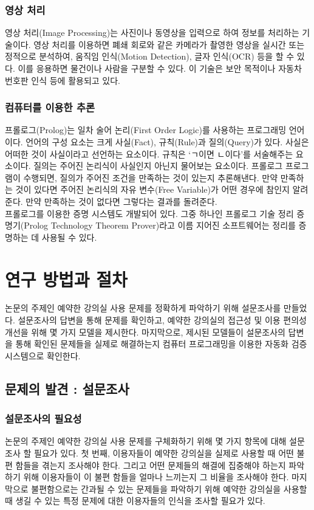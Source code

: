 \documentclass[11pt,a4paper]{article}
\begin{document}
\subsubsection{영상 처리}
영상 처리(Image Processing)는 사진이나 동영상을 입력으로 하여 정보를 처리하는 기술이다. 영상 처리를 이용하면 폐쇄 회로와 같은 카메라가 촬영한 영상을 실시간 또는 정적으로 분석하여, 움직임 인식(Motion Detection), 글자 인식(OCR) 등을 할 수 있다. 이를 응용하면 물건이나 사람을 구분할 수 있다. 이 기술은 보안 목적이나 자동차 번호판 인식 등에 활용되고 있다.

\subsubsection{컴퓨터를 이용한 추론}
프롤로그(Prolog)는 일차 술어 논리(First Order Logic)를 사용하는 프로그래밍 언어이다. 언어의 구성 요소는 크게 사실(Fact), 규칙(Rule)과 질의(Query)가 있다. 사실은 어떠한 것이 사실이라고 선언하는 요소이다. 규칙은 ‘ㄱ이면 ㄴ이다’를 서술해주는 요소이다. 질의는 주어진 논리식이 사실인지 아닌지 물어보는 요소이다. 프롤로그 프로그램이 수행되면, 질의가 주어진 조건을 만족하는 것이 있는지 추론해낸다. 만약 만족하는 것이 있다면 주어진 논리식의 자유 변수(Free Variable)가 어떤 경우에 참인지 알려준다. 만약 만족하는 것이 없다면 그렇다는 결과를 돌려준다.\\
프롤로그를 이용한 증명 시스템도 개발되어 있다. 그중 하나인 프롤로그 기술 정리 증명기(Prolog Technology Theorem Prover)라고 이름 지어진 소프트웨어는 정리를 증명하는 데 사용될 수 있다.

\section{연구 방법과 절차}
논문의 주제인 예약한 강의실 사용 문제를 정확하게 파악하기 위해 설문조사를 만들었다. 설문조사의 답변을 통해 문제를 확인하고, 예약한 강의실의 접근성 및 이용 편의성 개선을 위해 몇 가지 모델을 제시한다. 마지막으로, 제시된 모델들이 설문조사의 답변을 통해 확인된 문제들을 실제로 해결하는지 컴퓨터 프로그래밍을 이용한 자동화 검증 시스템으로 확인한다.

\subsection{문제의 발견 : 설문조사}

\subsubsection{설문조사의 필요성}
논문의 주제인 예약한 강의실 사용 문제를 구체화하기 위해 몇 가지 항목에 대해 설문조사 할 필요가 있다.
첫 번째, 이용자들이 예약한 강의실을 실제로 사용할 때 어떤 불편 함들을 겪는지 조사해야 한다.
그리고 어떤 문제들의 해결에 집중해야 하는지 파악하기 위해 이용자들이 이 불편 함들을 얼마나 느끼는지 그 비율을 조사해야 한다.
마지막으로 불편함으로는 간과될 수 있는 문제들을 파악하기 위해 예약한 강의실을 사용할 때 생길 수 있는 특정 문제에 대한 이용자들의 인식을 조사할 필요가 있다.
\end{document}
